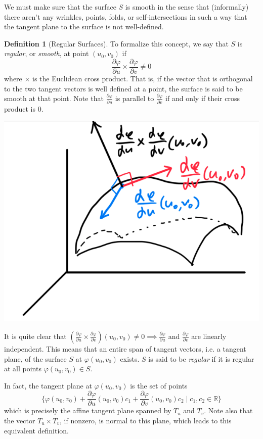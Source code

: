 \documentclass{article}
\theoremstyle{remark}
\theoremstyle{definition}
\newtheorem{definition}{Definition}[section]
\begin{document}
We must make sure that the surface $S$ is smooth in the sense that (informally) there aren't any wrinkles, points, folds, or self-intersections in such a way that the tangent plane to the surface is not well-defined. 

\begin{definition}[Regular Surfaces]
To formalize this concept, we say that $S$ is \textit{regular}, or \textit{smooth}, at point $(u_0, v_0)$ if
\[\frac{\partial \varphi}{\partial u} \times \frac{\partial \varphi}{\partial v} \neq 0\]
where $\times$ is the Euclidean cross product. That is, if the vector that is orthogonal to the two tangent vectors is well defined at a point, the surface is said to be smooth at that point. Note that $\frac{\partial \varphi}{\partial u}$ is parallel to $\frac{\partial \varphi}{\partial v}$ if and only if their cross product is $0$. 
\begin{center}
    \includegraphics[scale=0.3]{img/Cross_Product_Regular_Surfaces.PNG}
\end{center}
It is quite clear that $(\frac{\partial \varphi}{\partial u} \times \frac{\partial \varphi}{\partial v})(u_0, v_0) \neq 0 \implies \frac{\partial \varphi}{\partial u}$ and $\frac{\partial \varphi}{\partial v}$ are linearly independent. This means that an entire span of tangent vectors, i.e. a tangent plane, of the surface $S$ at $\varphi(u_0, v_0)$ exists. 
$S$ is said to be \textit{regular} if it is regular at all points $\varphi(u_0, v_0) \in S$. 
\end{definition}

In fact, the tangent plane at $\varphi(u_0, v_0)$ is the set of points 
\[\{\varphi(u_0, v_0) + \frac{\partial \varphi}{\partial u} (u_0, v_0) c_1 + \frac{\partial \varphi}{\partial v} (u_0, v_0) c_2 \; | \; c_1, c_2 \in \mathbb{R} \}\]
which is precisely the affine tangent plane spanned by $T_u$ and $T_v$. Note also that the vector $T_u \times T_v$, if nonzero, is normal to this plane, which leads to this equivalent definition. 
\end{document}
